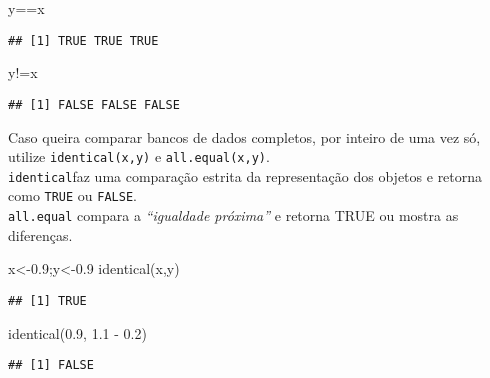 \documentclass[
]{book}
\newenvironment{Shaded}{\begin{snugshade}}{\end{snugshade}}
\newcommand{\FloatTok}[1]{\textcolor[rgb]{0.00,0.00,0.81}{#1}}
\newcommand{\FunctionTok}[1]{\textcolor[rgb]{0.00,0.00,0.00}{#1}}
\newcommand{\NormalTok}[1]{#1}
\newcommand{\OtherTok}[1]{\textcolor[rgb]{0.56,0.35,0.01}{#1}}
\newcommand{\SpecialCharTok}[1]{\textcolor[rgb]{0.00,0.00,0.00}{#1}}
\begin{document}
\begin{Shaded}
\begin{Highlighting}[]
\NormalTok{y}\SpecialCharTok{==}\NormalTok{x}
\end{Highlighting}
\end{Shaded}

\begin{verbatim}
## [1] TRUE TRUE TRUE
\end{verbatim}

\begin{Shaded}
\begin{Highlighting}[]
\NormalTok{y}\SpecialCharTok{!=}\NormalTok{x}
\end{Highlighting}
\end{Shaded}

\begin{verbatim}
## [1] FALSE FALSE FALSE
\end{verbatim}

Caso queira comparar bancos de dados completos, por inteiro de uma vez só, utilize \texttt{identical(x,y)} e \texttt{all.equal(x,y)}.\\
\texttt{identical}faz uma comparação estrita da representação dos objetos e retorna como \texttt{TRUE} ou \texttt{FALSE}.\\
\texttt{all.equal} compara a \emph{``igualdade próxima''} e retorna TRUE ou mostra as diferenças.

\begin{Shaded}
\begin{Highlighting}[]
\NormalTok{x}\OtherTok{\textless{}{-}}\FloatTok{0.9}\NormalTok{;y}\OtherTok{\textless{}{-}}\FloatTok{0.9}
\FunctionTok{identical}\NormalTok{(x,y)}
\end{Highlighting}
\end{Shaded}

\begin{verbatim}
## [1] TRUE
\end{verbatim}

\begin{Shaded}
\begin{Highlighting}[]
\FunctionTok{identical}\NormalTok{(}\FloatTok{0.9}\NormalTok{, }\FloatTok{1.1} \SpecialCharTok{{-}} \FloatTok{0.2}\NormalTok{)}
\end{Highlighting}
\end{Shaded}

\begin{verbatim}
## [1] FALSE
\end{verbatim}
\end{document}
